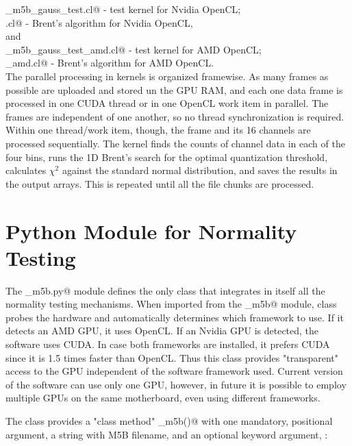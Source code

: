 \documentclass[letterpaper,twoside,12pt]{article}
\newcommand{\midtilde}{\raisebox{0.5ex}{\texttildelow}}
\begin{document}
\noindent \verb@ker_m5b_gauss_test.cl@ - test kernel for Nvidia OpenCL; \\
\noindent \verb@fminbndf.cl@ - Brent's algorithm for Nvidia OpenCL, \\

\noindent and \\

\noindent \verb@ker_m5b_gauss_test_amd.cl@ - test kernel for AMD OpenCL; \\
\noindent \verb@fminbndf_amd.cl@ - Brent's algorithm for AMD OpenCL. \\

The parallel processing in kernels is organized framewise. As many frames as possible are uploaded and stored un the GPU RAM, and each one data frame is processed in one CUDA thread or in one OpenCL work item in parallel. The frames are independent of one another, so no thread synchronization is required. Within one thread/work item, though, the frame and its 16 channels are processed sequentially. The kernel finds the counts of channel data in each of the four bins, runs the 1D Brent's search for the optimal quantization threshold, calculates $\chi^2$ against the standard normal distribution, and saves the results in the output arrays. This is repeated until all the file chunks are processed.





\section{Python Module for Normality Testing}

The \verb@gpu_m5b.py@ module defines the only class \verb@Normtest@ that integrates in itself all the normality testing mechanisms. When imported from the \verb@gpu_m5b@ module, \verb@Normtest@ class probes the hardware and automatically determines which framework to use. If it detects an AMD GPU, it uses OpenCL. If an Nvidia GPU is detected, the software uses CUDA. In case both frameworks are installed, it prefers CUDA since it is \midtilde 1.5  times faster than OpenCL. Thus this class provides "transparent" access to the GPU independent of the software framework used. Current version of the software can use only one GPU, however, in future it is possible to employ multiple GPUs on the same motherboard, even using different frameworks. 

The \verb@Normtest@ class provides a "class method" \verb@do_m5b()@ with one mandatory, positional argument, a string with M5B filename, and an optional keyword argument, \verb@nthreads@: \\
\end{document}
